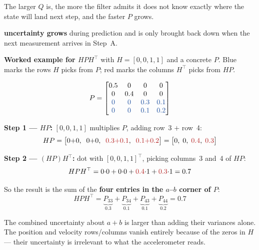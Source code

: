 \documentclass[12pt, a4paper]{article}
\begin{document}
The larger $Q$ is, the more the filter admits it does not know exactly
where the state will land next step, and the faster $P$ grows.

\textbf{uncertainty grows} during prediction and is only brought back
down when the next measurement arrives in Step~A.





\clearpage
\begin{notebox}
\textbf{Worked example for $HPH^\top$} with $H=[0,0,1,1]$ and a
concrete $P$. {\color{keyblue}Blue} marks the rows $H$ picks from $P$;
{\color{warnred}red} marks the columns $H^\top$ picks from $HP$.

\[
P =
\begin{bmatrix}
  0.5 & 0   & 0   & 0   \\
  0   & 0.4 & 0   & 0   \\
  {\color{keyblue}0} & {\color{keyblue}0} & {\color{keyblue}0.3} & {\color{keyblue}0.1} \\
  {\color{keyblue}0} & {\color{keyblue}0} & {\color{keyblue}0.1} & {\color{keyblue}0.2}
\end{bmatrix}
\]

\textbf{Step 1 --- $HP$:} $[0,0,1,1]$ multiplies $P$, adding
{\color{keyblue}row~3} $+$ {\color{keyblue}row~4}:
\[
  HP = \bigl[0{+}0,\;\; 0{+}0,\;\;
       {\color{warnred}0.3{+}0.1},\;\;
       {\color{warnred}0.1{+}0.2}\bigr]
     = \bigl[0,\;0,\;{\color{warnred}0.4},\;{\color{warnred}0.3}\bigr]
\]

\textbf{Step 2 --- $(HP)H^\top$:} dot with $[0,0,1,1]^\top$, picking
{\color{warnred}columns~3 and~4} of $HP$:
\[
  HPH^\top
  = 0{\cdot}0 + 0{\cdot}0
    + {\color{warnred}0.4}{\cdot}1
    + {\color{warnred}0.3}{\cdot}1
  = 0.7
\]

So the result is the sum of the \textbf{four entries in the
$a$--$b$ corner of $P$}:
\[
  HPH^\top
  = \underbrace{P_{33}}_{0.3}
  + \underbrace{P_{34}}_{0.1}
  + \underbrace{P_{43}}_{0.1}
  + \underbrace{P_{44}}_{0.2}
  = 0.7
\]

The combined uncertainty about $a+b$ is larger than adding their variances alone.
The position and velocity rows/columns vanish entirely because of
the zeros in $H$ --- their uncertainty is irrelevant to what the
accelerometer reads.
\end{notebox}
\end{document}

